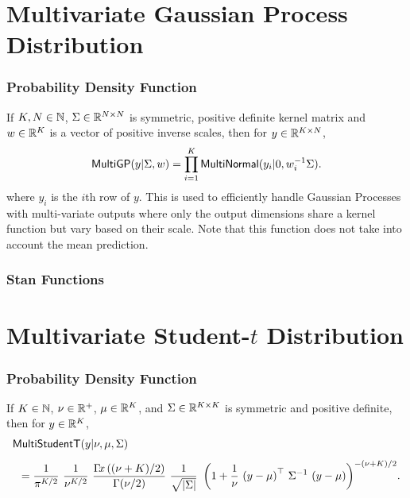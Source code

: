 \section{Multivariate Gaussian Process Distribution}

\subsubsection{Probability Density Function}

If $K,N \in \nats$, $\Sigma \in \reals^{N \times N}$ is symmetric,
positive definite kernel matrix and $w \in \reals^{K}$ is a vector of positive
inverse scales, then for $y \in \reals^{K \times N}$,
\[
\distro{MultiGP}(y|\Sigma,w)
=
\prod_{i=1}^{K} \distro{MultiNormal}(y_i|0,w_i^{-1} \Sigma).
\]
where $y_i$ is the $i$th row of $y$.  This is used to efficiently handle
Gaussian Processes with multi-variate outputs where only the output dimensions
share a kernel function but vary based on their scale.  Note that this
function does not take into account the mean prediction.


\subsubsection{Stan Functions}

\begin{description}
%
%
\end{description}



\section{Multivariate Student-$t$ Distribution}

\subsubsection{Probability Density Function}

If $K \in \nats$, $\nu \in \posreals$, $\mu \in \reals^K$, and $\Sigma
\in \reals^{K \times K}$ is symmetric and positive definite, then for
$y \in \reals^K$,
\[
\begin{array}{l}
\distro{MultiStudentT}(y|\nu,\mu,\Sigma)
\\[8pt]
\displaystyle
\hspace*{8pt}
=
\frac{1}{\pi^{K/2}}
\
\frac{1}{\nu^{K/2}}
\
\frac{\Gamma\!x\left((\nu + K)/2\right)}
     {\Gamma(\nu/2)}
\
\frac{1}{\sqrt{\left| \Sigma \right|}}
\
\left(
1 + \frac{1}{\nu} \, \left(y - \mu\right)^{\top} \, \Sigma^{-1} \, \left(y - \mu\right)
\right)^{-(\nu + K)/2}
\! .
\end{array}
\]
\vspace*{4pt}

